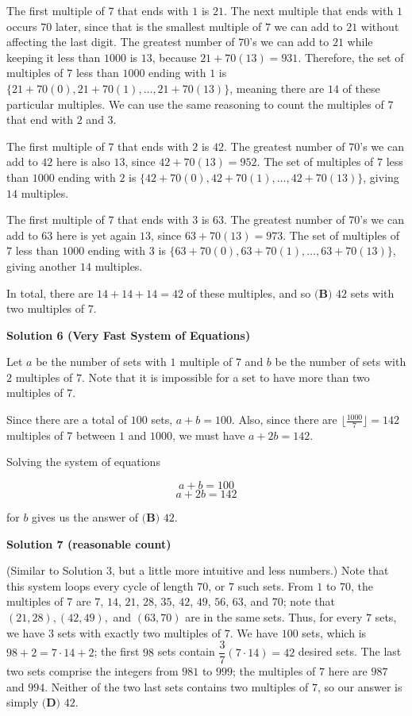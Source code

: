 \begin{enumerate}
 The first multiple of $7$ that ends with $1$ is $21$. The next multiple that ends with $1$ occurs $70$ later, since that is the smallest multiple of $7$ we can add to $21$ without affecting the last digit. The greatest number of $70$'s we can add to $21$ while keeping it less than $1000$ is $13$, because $21 + 70(13) = 931$. Therefore, the set of multiples of $7$ less than $1000$ ending with $1$ is $\{21 + 70(0), 21+70(1),\ldots,21+70(13)\}$, meaning there are $14$ of these particular multiples. We can use the same reasoning to count the multiples of $7$ that end with $2$ and $3$. 

 The first multiple of $7$ that ends with $2$ is $42$. The greatest number of $70$'s we can add to $42$ here is also $13$, since $42 + 70(13) = 952$. The set of multiples of $7$ less than $1000$ ending with $2$ is $\{42 + 70(0), 42+70(1),\ldots,42+70(13)\}$, giving $14$ multiples.

 The first multiple of $7$ that ends with $3$ is $63$. The greatest number of $70$'s we can add to $63$ here is yet again $13$, since $63 + 70(13) = 973$. The set of multiples of $7$ less than $1000$ ending with $3$ is $\{63 + 70(0), 63+70(1),\ldots,63+70(13)\}$, giving another $14$ multiples.

 In total, there are $14 + 14 + 14 = 42$ of these multiples, and so $\boxed{\textbf{(B) }42}$ sets with two multiples of $7$.

 



\textbf{Solution 6 (Very Fast System of Equations)}

Let $a$ be the number of sets with $1$ multiple of $7$ and $b$ be the number of sets with $2$ multiples of $7$. Note that it is impossible for a set to have more than two multiples of $7$. 

 Since there are a total of $100$ sets, $a+b=100$. Also, since there are $\lfloor \frac{1000}{7}\rfloor = 142$ multiples of $7$ between $1$ and $1000$, we must have $a+2b=142$. 

 Solving the system of equations

 
 \[a+b=100\]
 \[a+2b=142\]

 for $b$ gives us the answer of $\boxed{\textbf{(B) }42}$.

 



\textbf{Solution 7 (reasonable count)}

(Similar to Solution 3, but a little more intuitive and less numbers.) Note that this system loops every cycle of length $70$, or $7$ such sets. From $1$ to $70$, the multiples of $7$ are $7$, $14$, $21$, $28$, $35$, $42$, $49$, $56$, $63$, and $70$; note that $(21,28),(42,49),$ and $(63,70)$ are in the same sets. Thus, for every $7$ sets, we have $3$ sets with exactly two multiples of $7$. We have $100$ sets, which is $98+2=7\cdot14+2$; the first $98$ sets contain $\dfrac37(7\cdot14)=42$ desired sets. The last two sets comprise the integers from $981$ to $999$; the multiples of $7$ here are $987$ and $994$. Neither of the two last sets contains two multiples of $7$, so our answer is simply $\boxed{\textbf{(D) }42}$. 


\end{enumerate}
